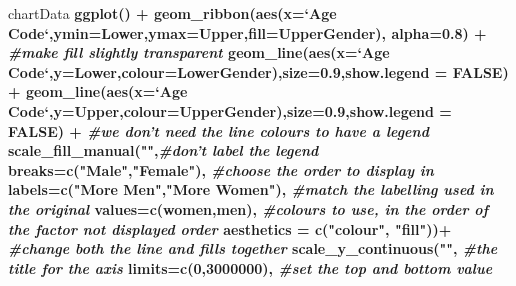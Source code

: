 \documentclass[]{article}
\newenvironment{Shaded}{\begin{snugshade}}{\end{snugshade}}
\newcommand{\KeywordTok}[1]{\textcolor[rgb]{0.13,0.29,0.53}{\textbf{#1}}}
\newcommand{\DataTypeTok}[1]{\textcolor[rgb]{0.13,0.29,0.53}{#1}}
\newcommand{\DecValTok}[1]{\textcolor[rgb]{0.00,0.00,0.81}{#1}}
\newcommand{\FloatTok}[1]{\textcolor[rgb]{0.00,0.00,0.81}{#1}}
\newcommand{\StringTok}[1]{\textcolor[rgb]{0.31,0.60,0.02}{#1}}
\newcommand{\CommentTok}[1]{\textcolor[rgb]{0.56,0.35,0.01}{\textit{#1}}}
\newcommand{\OtherTok}[1]{\textcolor[rgb]{0.56,0.35,0.01}{#1}}
\newcommand{\OperatorTok}[1]{\textcolor[rgb]{0.81,0.36,0.00}{\textbf{#1}}}
\newcommand{\NormalTok}[1]{#1}
\begin{document}
\begin{Shaded}
\begin{Highlighting}[]
\NormalTok{chartData }\OperatorTok{%>%}\StringTok{ }\KeywordTok{filter}\NormalTok{(Year}\OperatorTok{==}\DecValTok{2014}\NormalTok{) }\OperatorTok{%>%}
\StringTok{  }\KeywordTok{ggplot}\NormalTok{() }\OperatorTok{+}
\StringTok{  }\KeywordTok{geom_ribbon}\NormalTok{(}\KeywordTok{aes}\NormalTok{(}\DataTypeTok{x=}\StringTok{`}\DataTypeTok{Age Code}\StringTok{`}\NormalTok{,}\DataTypeTok{ymin=}\NormalTok{Lower,}\DataTypeTok{ymax=}\NormalTok{Upper,}\DataTypeTok{fill=}\NormalTok{UpperGender),}
              \DataTypeTok{alpha=}\FloatTok{0.8}\NormalTok{) }\OperatorTok{+}\StringTok{ }\CommentTok{#make fill slightly transparent}
\StringTok{  }\KeywordTok{geom_line}\NormalTok{(}\KeywordTok{aes}\NormalTok{(}\DataTypeTok{x=}\StringTok{`}\DataTypeTok{Age Code}\StringTok{`}\NormalTok{,}\DataTypeTok{y=}\NormalTok{Lower,}\DataTypeTok{colour=}\NormalTok{LowerGender),}\DataTypeTok{size=}\FloatTok{0.9}\NormalTok{,}\DataTypeTok{show.legend =} \OtherTok{FALSE}\NormalTok{) }\OperatorTok{+}\StringTok{ }
\StringTok{  }\KeywordTok{geom_line}\NormalTok{(}\KeywordTok{aes}\NormalTok{(}\DataTypeTok{x=}\StringTok{`}\DataTypeTok{Age Code}\StringTok{`}\NormalTok{,}\DataTypeTok{y=}\NormalTok{Upper,}\DataTypeTok{colour=}\NormalTok{UpperGender),}\DataTypeTok{size=}\FloatTok{0.9}\NormalTok{,}\DataTypeTok{show.legend =} \OtherTok{FALSE}\NormalTok{) }\OperatorTok{+}\StringTok{ }\CommentTok{#we don't need the line colours to have a legend}
\StringTok{  }\KeywordTok{scale_fill_manual}\NormalTok{(}\StringTok{""}\NormalTok{,}\CommentTok{#don't label the legend}
                    \DataTypeTok{breaks=}\KeywordTok{c}\NormalTok{(}\StringTok{"Male"}\NormalTok{,}\StringTok{"Female"}\NormalTok{), }\CommentTok{#choose the order to display in }
                    \DataTypeTok{labels=}\KeywordTok{c}\NormalTok{(}\StringTok{"More Men"}\NormalTok{,}\StringTok{"More Women"}\NormalTok{), }\CommentTok{#match the labelling used in the original}
                    \DataTypeTok{values=}\KeywordTok{c}\NormalTok{(women,men), }\CommentTok{#colours to use, in the order of the factor not displayed order}
                    \DataTypeTok{aesthetics =} \KeywordTok{c}\NormalTok{(}\StringTok{"colour"}\NormalTok{, }\StringTok{"fill"}\NormalTok{))}\OperatorTok{+}\StringTok{ }\CommentTok{#change both the line and fills together}
\StringTok{  }\KeywordTok{scale_y_continuous}\NormalTok{(}\StringTok{""}\NormalTok{, }\CommentTok{#the title for the axis}
                     \DataTypeTok{limits=}\KeywordTok{c}\NormalTok{(}\DecValTok{0}\NormalTok{,}\DecValTok{3000000}\NormalTok{), }\CommentTok{#set the top and bottom value}
}
\end{Highlighting}
\end{Shaded}
\end{document}
